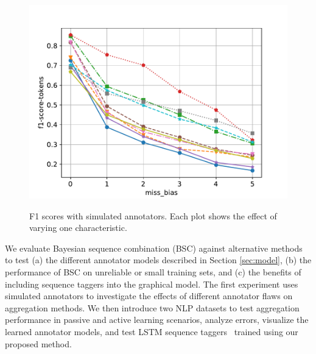 \begin{figure}
{  \includegraphics[width=0.9\columnwidth, clip=True, trim=10 20 40 40]{figures/synthetic/class_bias_exp/plot_f1-score-tokens}
}\\
\caption{F1 scores with simulated annotators. Each plot shows the effect of varying one characteristic.}
\label{fig:simulated}
\end{figure}


We evaluate Bayesian sequence combination (BSC) against alternative methods to test 
 (a) the different annotator models described in Section \ref{sec:model},
 (b) the performance of BSC on unreliable or small training sets,
and (c) the benefits of including sequence taggers into the graphical model.
The first experiment uses simulated annotators to investigate the effects of different annotator flaws on aggregation methods. 
We then introduce two NLP datasets to 
test aggregation performance in passive and active learning scenarios, 
analyze errors,
visualize the learned annotator models,
and test LSTM 
sequence taggers~\cite{lample2016neural}
trained using our proposed method.

